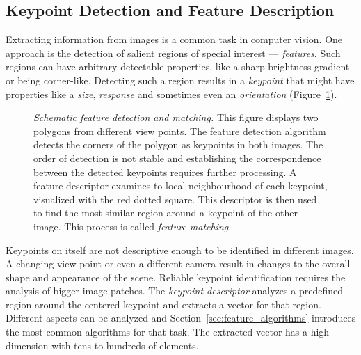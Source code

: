 \subsection{Keypoint Detection and Feature Description}

Extracting information from images is a common task in computer vision.
One approach is the detection of salient regions of special interest --- \emph{features}.
Such regions can have arbitrary detectable properties, like a sharp brightness gradient or being corner-like.
Detecting such a region results in a \emph{keypoint} that might have properties like a \emph{size}, \emph{response} and sometimes even an \emph{orientation} (Figure~\ref{fig:features_example}).
\begin{figure}[H]
    \scalebox{0.95}{%
    
    }
    \caption[Schematic feature detection and matching]{\emph{Schematic feature detection and matching.} This figure displays two polygons from different view points. The feature detection algorithm detects the corners of the polygon as keypoints in both images. The order of detection is not stable and establishing the correspondence between the detected keypoints requires further processing. A feature descriptor examines to local neighbourhood of each keypoint, visualized with the red dotted square. This descriptor is then used to find the most similar region around a keypoint of the other image. This process is called \emph{feature matching}.}\label{fig:features_example}
\end{figure}
Keypoints on itself are not descriptive enough to be identified in different images.
A changing view point or even a different camera result in changes to the overall shape and appearance of the scene.
Reliable keypoint identification requires the analysis of bigger image patches.
The \emph{keypoint descriptor} analyzes a predefined region around the centered keypoint and extracts a vector for that region.
Different aspects can be analyzed and Section~\ref{sec:feature_algorithms} introduces the most common algorithms for that task.
The extracted vector has a high dimension with tens to hundreds of elements.


